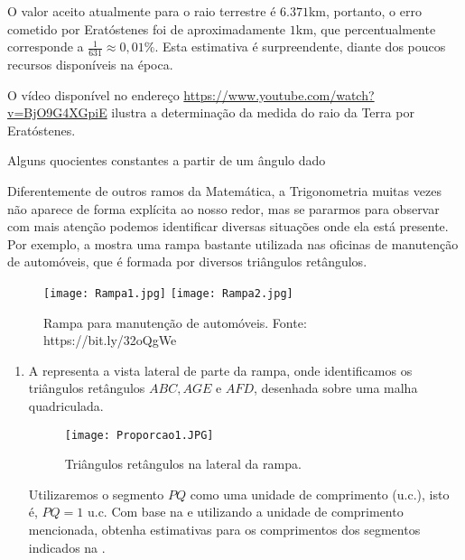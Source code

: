  O valor aceito atualmente para o raio terrestre é $6.371$km, portanto, o erro cometido por Eratóstenes foi de aproximadamente $1$km, que percentualmente corresponde a $\frac{1}{631} \approx 0,01\%$. Esta estimativa é surpreendente, diante dos poucos recursos disponíveis na época. 
 
 O vídeo disponível no endereço \url{https://www.youtube.com/watch?v=BjO9G4XGpiE} ilustra a determinação da medida do raio da Terra por Eratóstenes.

\newpage
\begin{task}{Alguns quocientes constantes a partir de um ângulo dado}

Diferentemente de outros ramos da Matemática, a Trigonometria muitas vezes não aparece de forma explícita ao nosso redor, mas se pararmos para observar com mais atenção podemos identificar diversas situações onde ela está presente. Por exemplo, a   mostra uma rampa bastante utilizada nas oficinas de manutenção de automóveis, que é formada por diversos triângulos retângulos.
\begin{figure}[H]
    \centering
    \texttt{[image: Rampa1.jpg]}
    \texttt{[image: Rampa2.jpg]}
    \caption{Rampa para manutenção de automóveis. Fonte: https://bit.ly/32oQgWe}
    \label{Rampas}
\end{figure}

\begin{enumerate}
    \item{}
    A   representa a vista lateral de parte da rampa, onde identificamos os triângulos retângulos $ABC, AGE$ e $AFD$, desenhada sobre uma malha quadriculada.
    \begin{figure}[H]
    \centering
    \texttt{[image: Proporcao1.JPG]}
    \caption{Triângulos retângulos na lateral da rampa.}
    \label{Proporcao1}
\end{figure}

Utilizaremos o segmento $PQ$ como uma unidade de comprimento (u.c.), isto é, $PQ=1$ u.c. Com base na   e utilizando a unidade de comprimento mencionada, obtenha estimativas para os comprimentos dos segmentos indicados na  .


\end{enumerate}
\end{task}
